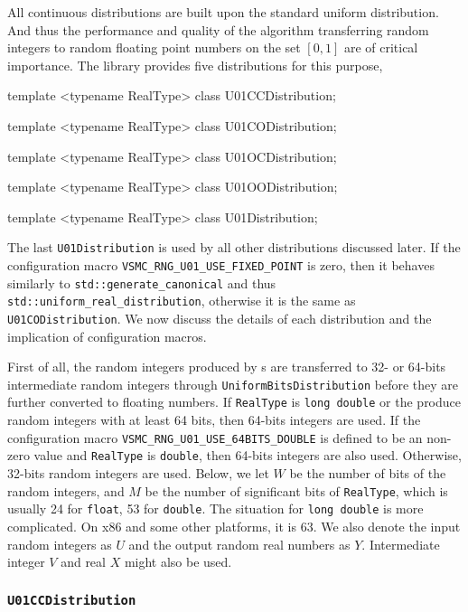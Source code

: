 All continuous distributions are built upon the standard uniform distribution.
And thus the performance and quality of the algorithm transferring random
integers to random floating point numbers on the set $[0, 1]$ are of critical
importance. The library provides five distributions for this purpose,
\begin{cppcode}
  template <typename RealType>
  class U01CCDistribution;

  template <typename RealType>
  class U01CODistribution;

  template <typename RealType>
  class U01OCDistribution;

  template <typename RealType>
  class U01OODistribution;

  template <typename RealType>
  class U01Distribution;
\end{cppcode}
The last \verb|U01Distribution| is used by all other distributions discussed
later. If the configuration macro \verb|VSMC_RNG_U01_USE_FIXED_POINT| is zero,
then it behaves similarly to \verb|std::generate_canonical| and thus
\verb|std::uniform_real_distribution|, otherwise it is the same as
\verb|U01CODistribution|. We now discuss the details of each distribution and
the implication of configuration macros.

First of all, the random integers produced by \rng{}s are transferred to 32- or
64-bits intermediate random integers through \verb|UniformBitsDistribution|
before they are further converted to floating numbers. If \verb|RealType| is
\verb|long double| or the \rng{} produce random integers with at least 64 bits,
then 64-bits integers are used. If the configuration macro
\verb|VSMC_RNG_U01_USE_64BITS_DOUBLE| is defined to be an non-zero value and
\verb|RealType| is \verb|double|, then 64-bits integers are also used.
Otherwise, 32-bits random integers are used. Below, we let $W$ be the number of
bits of the random integers, and $M$ be the number of significant bits of
\verb|RealType|, which is usually 24 for \verb|float|, 53 for \verb|double|.
The situation for \verb|long double| is more complicated. On x86 and some other
platforms, it is 63. We also denote the input random integers as $U$ and the
output random real numbers as $Y$. Intermediate integer $V$ and real $X$ might
also be used.

\subsubsection{\texttt{U01CCDistribution}}


